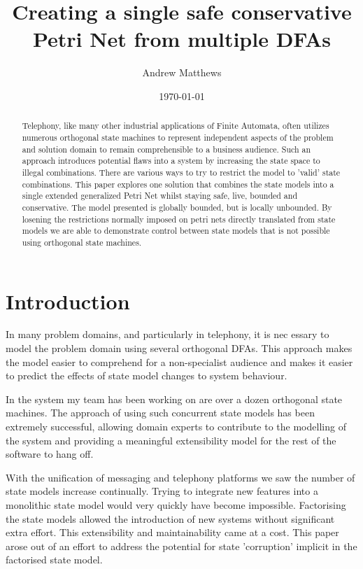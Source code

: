 \documentclass[a4paper]{article}
\title{Creating a single safe conservative Petri Net from multiple DFAs}
\author{Andrew Matthews}
\date{\today}
\begin{document}
\maketitle
\begin{abstract}
Telephony, like many other industrial applications of Finite Automata, often utilizes numerous orthogonal state machines to represent independent aspects of the problem and solution domain to remain comprehensible to a business audience. Such an approach introduces potential flaws into a system by increasing the state space to illegal combinations. There are various ways to try to restrict the model to 'valid' state combinations. This paper explores one solution that combines the state models into a single extended generalized Petri Net whilst staying safe, live, bounded and conservative. The model presented is globally bounded, but is locally unbounded. By losening the restrictions normally imposed on petri nets directly translated from state models we are able to demonstrate control between state models that is not possible using orthogonal state machines.
\end{abstract}

\section{Introduction}
In many problem domains, and particularly in telephony, it is nec essary to model the problem domain using several orthogonal DFAs. This approach makes the model easier to comprehend for a non-specialist audience and makes it easier to predict the effects of state model changes to system behaviour. 

In the system my team has been working on are over a dozen orthogonal state machines. The approach of using such concurrent state models has been extremely successful, allowing domain experts to contribute to the modelling of the system and providing a meaningful extensibility model for the rest of the software to hang off. 

With the unification of messaging and telephony platforms we saw the number of state models increase continually. Trying to integrate new features into a monolithic state model would very quickly have become impossible. Factorising the state models allowed the introduction of new systems without significant extra effort. This extensibility and maintainability came at a cost. This paper arose out of an effort to address the potential for state 'corruption' implicit in the factorised state model.
\end{document}
